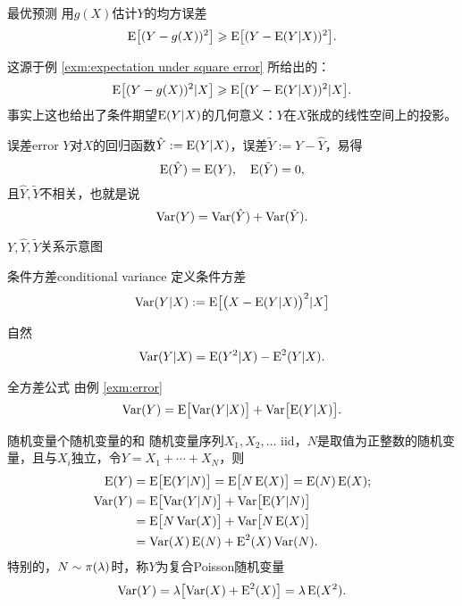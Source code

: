 \begin{theorem}{最优预测}{}
	用$g(X)$估计$Y$的均方误差
	\begin{align}
		\E\bigfkh{(Y-g(X))^2}\geqslant\E\bigfkh{(Y-\E(Y|X))^2}.
	\end{align}
\end{theorem}
这源于例 \ref{exm:expectation under square error} 所给出的：
\[
	\E\bigfkh{(Y-g(X))^2|X}\geqslant\E\bigfkh{(Y-\E(Y|X))^2|X}.
\]
事实上这也给出了条件期望$\E(Y|X)$的几何意义：$Y$在$X$张成的线性空间上的投影。
\begin{example}{误差}{error}
	$Y$对$X$的回归函数$\hat Y:=\E(Y|X)$，误差$\tilde Y:=Y-\hat Y$，易得
	\[
		\E(\hat Y)=\E(Y),\quad\E(\tilde Y)=0,
	\]
	且$\hat Y,\tilde Y$不相关，也就是说
	\[
		\Var(Y)=\Var(\hat Y)+\Var(\tilde Y).
	\]
	\begin{center}
		\tikzchap $Y,\hat Y,\tilde Y$关系示意图
	\end{center}
\end{example}
\begin{definition}{条件方差}{conditional variance}
	定义条件方差
	\begin{align}
		\Var(Y|X):=\E\bigfkh{\bigkh{X-\E(Y|X)}^2|X}
	\end{align}
\end{definition}
自然
\begin{align}
	\Var(Y|X)=\E(Y^2|X)-\E^2(Y|X).
\end{align}
\begin{theorem}{全方差公式}{}
	由例 \ref{exm:error}
	\begin{align}
		\Var(Y)=\E\bigfkh{\Var(Y|X)}+\Var\bigfkh{\E(Y|X)}.
	\end{align}
\end{theorem}
\begin{example}{随机变量个随机变量的和}{}
	随机变量序列$X_1,X_2,\ldots$ iid，$N$是取值为正整数的随机变量，且与$X_i$独立，令$Y=X_1+\cdots+X_N$，则
	\begin{align}
		\E(Y)&=\E\bigfkh{\E(Y|N)}=\E\bigfkh{N\E(X)}=\E(N)\E(X);\\\notag
		\Var(Y)&=\E\bigfkh{\Var(Y|N)}+\Var\bigfkh{\E(Y|N)}\\\notag
		&=\E\bigfkh{N\Var(X)}+\Var\bigfkh{N\E(X)}\\
		&=\Var(X)\E(N)+\E^2(X)\Var(N).
	\end{align}
	特别的，$N\sim\Pois(\lambda)$时，称$Y$为复合Poisson随机变量
	\[
		\Var(Y)=\lambda\bigfkh{\Var(X)+\E^2(X)}=\lambda\E(X^2).
	\]
\end{example}
\clearpage
